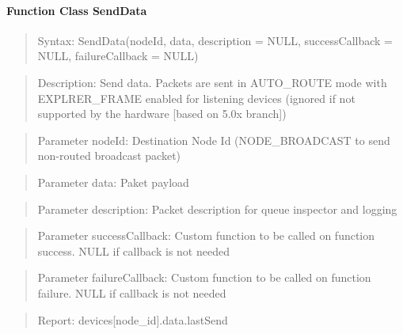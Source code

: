 \paragraph{Function Class SendData}
\begin{quote}Syntax: SendData(nodeId, data, description = NULL, successCallback = NULL, failureCallback = NULL)\end{quote}
\begin{quote}Description: Send data. Packets are sent in AUTO\_ROUTE mode with EXPLRER\_FRAME enabled for listening devices (ignored if not supported by the hardware [based on 5.0x branch])\end{quote}
\begin{quote}Parameter nodeId: Destination Node Id (NODE\_BROADCAST to send non-routed broadcast packet)\end{quote}
\begin{quote}Parameter data: Paket payload\end{quote}
\begin{quote}Parameter description: Packet description for queue inspector and logging\end{quote}
\begin{quote}Parameter successCallback: Custom function to be called on function success. NULL if callback is not needed\end{quote}
\begin{quote}Parameter failureCallback: Custom function to be called on function failure. NULL if callback is not needed\end{quote}
\begin{quote}Report: devices[node\_id].data.lastSend\end{quote}

